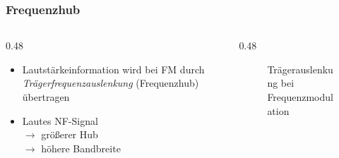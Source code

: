 \begin{frame}
    \frametitle{Frequenzhub}
    \begin{columns}
        \begin{column}{0.48\textwidth}
            \begin{itemize}
                \item Lautstärkeinformation wird bei FM durch \emph{Trägerfrequenzauslenkung} (Frequenzhub) übertragen
                \item Lautes NF-Signal\\$\rightarrow$ größerer Hub\\$\rightarrow$ höhere Bandbreite
            \end{itemize}
        \end{column}
        \begin{column}{0.48\textwidth}
            \begin{figure}
                \caption{\scriptsize Trägerauslenkung bei Frequenzmodulation}
                \label{e_frequenzmodulation_frequenzhub}
            \end{figure}
        \end{column}
    \end{columns}
\end{frame}

